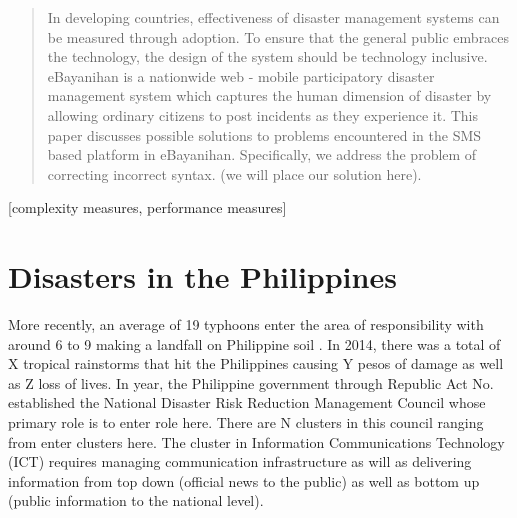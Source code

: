 \documentclass{acm_proc_article-sp}
\begin{document}
\date{30 July 1999}

\maketitle
\begin{abstract}
In developing countries, effectiveness of disaster management systems can be measured through adoption. To ensure that the general public embraces the technology, the design of the system should be technology inclusive. eBayanihan is a nationwide web - mobile participatory disaster management system which captures the human dimension of disaster by allowing ordinary citizens to post incidents as they experience it. This paper discusses possible solutions to problems encountered in the SMS based platform in eBayanihan. Specifically, we address the problem of correcting incorrect syntax. (we will place our solution here).


\end{abstract}


[complexity measures, performance measures]



\section{Disasters in the Philippines}
More recently, an average of 19 typhoons enter the area of responsibility with around 6 to 9 making a landfall on Philippine soil \cite{shoemaker1991:typhoons}. In 2014, there was a total of X tropical rainstorms that hit the Philippines causing Y pesos of damage as well as Z loss of lives. In year, the Philippine government through Republic Act No. established the National Disaster Risk Reduction Management Council whose primary role is to enter role here. There are N clusters in this council ranging from enter clusters here. The cluster in Information Communications Technology (ICT) requires managing communication infrastructure as will as delivering information from top down (official news to the public) as well as bottom up (public information to the national level). 
\end{document}
